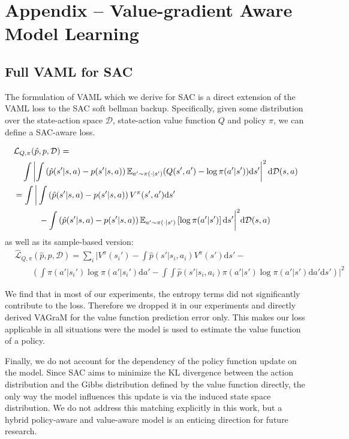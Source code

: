 \chapter{Appendix -- Value-gradient Aware Model Learning}

\section{Full VAML for SAC}
\label{app:vagram:vaml_sac}
The formulation of VAML which we derive for SAC is a direct extension of the VAML loss to the SAC soft bellman backup. Specifically, given some distribution over the state-action space $\mathcal{D}$, state-action value function $Q$ and policy $\pi$, we can define a SAC-aware loss.

\begin{align}
    &\mathcal{L}_{Q, \pi}(\hat{p}, p, \mathcal{D}) = \nonumber\\
    &\quad \int \left|\int \left(\hat{p}(s'|s,a) - p(s'|s,a)\right) \mathbb{E}_{a' \sim \pi(\cdot| s')}{\left(Q(s', a') - \log \pi(a'|s')\right)} \mathrm{d}s'\right|^2 \mathrm{d} \mathcal{D}(s,a)\\
    &= \int \bigg|\int \left(\hat{p}(s'|s,a) - p(s'|s,a)\right) V^\pi(s', a')\mathrm{d}s' \nonumber\\
    &\quad\quad\quad- \int \left(\hat{p}(s'|s,a) - p(s'|s,a)\right)\mathbb{E}_{a' \sim \pi(\cdot| s')}\left[\log \pi(a'|s')\right] \mathrm{d}s'\bigg|^2 \mathrm{d} \mathcal{D}(s,a)
\end{align}
as well as its sample-based version:
\begin{align}
    &\hat{\mathcal{L}}_{Q, \pi}(\hat{p}, p, \mathcal{D}) = \sum_{i} \bigg|V^\pi(s_i') -\int \hat{p}(s'|s_i, a_i) V^\pi(s') \mathrm{d}s' - \nonumber\\&\quad\quad\left(\int \pi(a'|s_i')\log\pi(a' | s_i') \mathrm{d}a'- \int \int \hat{p}(s'|s_i,a_i)\pi(a'|s')\log\pi(a' | s')\mathrm{d}a' \mathrm{d}s' \right)\bigg|^2\label{SACVAMLLoss}
\end{align}

We find that in most of our experiments, the entropy terms did not significantly contribute to the loss. 
Therefore we dropped it in our experiments and directly derived VAGraM for the value function prediction error only.
This makes our loss applicable in all situations were the model is used to estimate the value function of a policy.

Finally, we do not account for the dependency of the policy function update on the model.
Since SAC aims to minimize the KL divergence between the action distribution and the Gibbs distribution defined by the value function directly, the only way the model influences this update is via the induced state space distribution.
We do not address this matching explicitly in this work, but a hybrid policy-aware and value-aware model is an enticing direction for future research.

